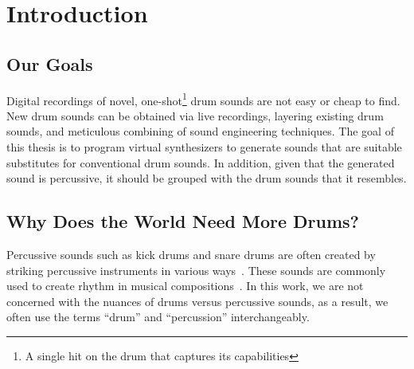 \documentclass[\main/thesis.tex]{subfiles}
\begin{document}
\chapter{Introduction}


\section{Our Goals}
Digital recordings of novel, one-shot\footnote{A single hit on the drum that captures its capabilities} drum sounds are not easy or cheap to find. New drum sounds can be obtained via live recordings, layering existing drum sounds, and meticulous combining of sound engineering techniques. The goal of this thesis is to program virtual synthesizers to generate sounds that are suitable substitutes for conventional drum sounds. In addition, given that the generated sound is percussive, it should be grouped with the drum sounds that it resembles.


\section{Why Does the World Need More Drums?}
Percussive sounds such as kick drums and snare drums are often created by striking percussive instruments in various ways~\cite{barry2005drum}. These sounds are commonly used to create rhythm in musical compositions~\cite{needham1967percussion}. In this work, we are not concerned with the nuances of drums versus percussive sounds, as a result, we often use the terms \enquote{drum} and \enquote{percussion} interchangeably.
\end{document}
